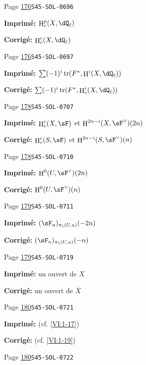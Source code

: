 \documentclass[oneside]{book}
\DeclareMathOperator{\h}{H}
\DeclareMathOperator{\tr}{tr}
\theoremstyle{sga-source}
\theoremstyle{sga-source-dash}
\theoremstyle{sga-source-dotdash}
\theoremstyle{sga-source-number-note-dash}
\theoremstyle{sga-source-note-number-dotdash}
\theoremstyle{sga-source-example-dotdash}
\theoremstyle{sga-source-inline-number}
\theoremstyle{sga-source-bare-number}
\theoremstyle{sga-source}
\begin{document}
\begin{description}
\smallskip
\item[\hypertarget{apparatus:FR-0141}{141}] Page \hyperlink{printpage:fr:176}{176}\quad\texttt{S45-SOL-0696}
\par\noindent\textbf{Imprimé:} \(\h_c^p(X,\dQ_\ell)\)
\par\noindent\textbf{Corrigé:} \(\h_c^i(X,\dQ_\ell)\)
\smallskip
\item[\hypertarget{apparatus:FR-0142}{142}] Page \hyperlink{printpage:fr:176}{176}\quad\texttt{S45-SOL-0697}
\par\noindent\textbf{Imprimé:} \(\sum (-1)^i \tr(F^\ast,\h^i(X,\dQ_\ell))\)
\par\noindent\textbf{Corrigé:} \(\sum (-1)^i \tr(F^\ast,\h_c^i(X,\dQ_\ell))\)
\smallskip
\item[\hypertarget{apparatus:FR-0143}{143}] Page \hyperlink{printpage:fr:178}{178}\quad\texttt{S45-SOL-0707}
\par\noindent\textbf{Imprimé:} $\h_c^i(X,\sF)$ et $\h^{2n-i}(X,\sF^\vee)(2n)$
\par\noindent\textbf{Corrigé:} $\h_c^i(S,\sF)$ et $\h^{2n-i}(S,\sF^\vee)(n)$
\smallskip
\item[\hypertarget{apparatus:FR-0144}{144}] Page \hyperlink{printpage:fr:178}{178}\quad\texttt{S45-SOL-0710}
\par\noindent\textbf{Imprimé:} \(\h^0(U,\sF^\vee)(2n)\)
\par\noindent\textbf{Corrigé:} \(\h^0(U,\sF^\vee)(n)\)
\smallskip
\item[\hypertarget{apparatus:FR-0145}{145}] Page \hyperlink{printpage:fr:179}{179}\quad\texttt{S45-SOL-0711}
\par\noindent\textbf{Imprimé:} \((\sF_u)_{\pi_1(U,u)}(-2n)\)
\par\noindent\textbf{Corrigé:} \((\sF_u)_{\pi_1(U,u)}(-n)\)
\smallskip
\item[\hypertarget{apparatus:FR-0146}{146}] Page \hyperlink{printpage:fr:179}{179}\quad\texttt{S45-SOL-0719}
\par\noindent\textbf{Imprimé:} un ouvert de $X$
\par\noindent\textbf{Corrigé:} un ouvert de $\bar X$
\smallskip
\item[\hypertarget{apparatus:FR-0147}{147}] Page \hyperlink{printpage:fr:180}{180}\quad\texttt{S45-SOL-0721}
\par\noindent\textbf{Imprimé:} (cf. \ref{VI:1-17})
\par\noindent\textbf{Corrigé:} (cf. \ref{VI:1-19})
\smallskip
\item[\hypertarget{apparatus:FR-0148}{148}] Page \hyperlink{printpage:fr:180}{180}\quad\texttt{S45-SOL-0722}

\end{description}
\end{document}
